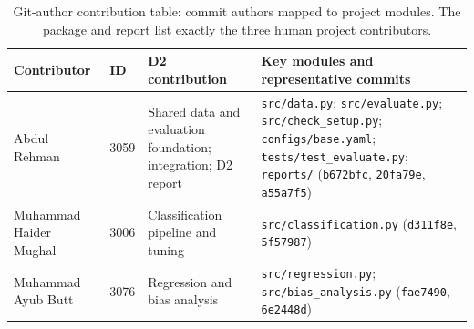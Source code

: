 \begin{table}[htbp]
\centering
\footnotesize
\caption{Git-author contribution table: commit authors mapped to project modules. The package and report list exactly the three human project contributors.}
\label{tab:git-authors}
\begin{tabular}{llL{4.5cm}L{4.9cm}}
\toprule
Contributor & ID & D2 contribution & Key modules and representative commits \\
\midrule
Abdul Rehman & 3059 & Shared data and evaluation foundation; integration; D2 report & \texttt{src/data.py}; \texttt{src/evaluate.py}; \texttt{src/check\_setup.py}; \texttt{configs/base.yaml}; \texttt{tests/test\_evaluate.py}; \texttt{reports/} (\texttt{b672bfc}, \texttt{20fa79e}, \texttt{a55a7f5}) \\
Muhammad Haider Mughal & 3006 & Classification pipeline and tuning & \texttt{src/classification.py} (\texttt{d311f8e}, \texttt{5f57987}) \\
Muhammad Ayub Butt & 3076 & Regression and bias analysis & \texttt{src/regression.py}; \texttt{src/bias\_analysis.py} (\texttt{fae7490}, \texttt{6e2448d}) \\
\bottomrule
\end{tabular}
\end{table}
